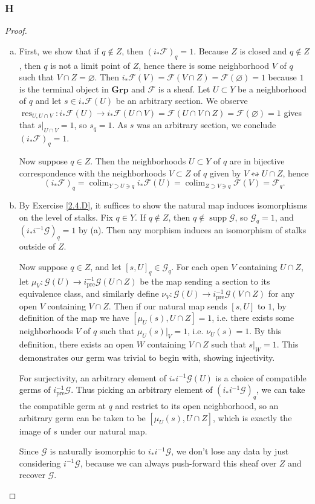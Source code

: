 \documentclass{article}
\newcommand{\fF}{\mathscr{F}}
\newcommand{\fG}{\mathscr{G}}
\newcommand{\Grp}{\mathbf{Grp}} %
\DeclareMathOperator{\res}{\mathrm{res}}
\DeclareMathOperator{\pre}{\mathrm{pre}}
\DeclareMathOperator{\colim}{\mathrm{colim}}
\DeclareMathOperator{\supp}{\mathrm{supp}}
\let\emptyset\varnothing
\begin{document}
\subsubsection{H}\label{2.7.H}
\begin{proof}
    \begin{enumerate}[(a)]
        \item First, we show that if $q\notin Z$, then $(i_* \fF)_q = 1$. Because $Z$ is closed and $q\notin Z$, then $q$ is not a limit point of $Z$, hence there is some neighborhood $V$ of $q$ such that $V\cap Z = \emptyset$. Then $i_*\fF(V) = \fF(V\cap Z)=\fF(\emptyset)=1$ because $1$ is the terminal object in $\Grp$ and $\fF$ is a sheaf. Let $U\subset Y$ be a neighborhood of $q$ and let $s\in i_*\fF(U)$ be an arbitrary section. We observe $\res_{U,U\cap V}:i_* \fF(U) \to i_*\fF(U\cap V)= \fF(U\cap V \cap Z)=\fF(\emptyset)=1$ gives that $s\vert_{U\cap V}=1$, so $s_q=1$. As $s$ was an arbitrary section, we conclude $(i_* \fF)_q =1$.
        
        Now suppose $q\in Z$. Then the neighborhoods $U\subset Y$ of $q$ are in bijective correspondence with the neighborhoods $V\subset Z$ of $q$ given by $V\leftrightsquigarrow U\cap Z$, hence
        \[
        (i_* \fF)_q = \colim_{Y\supset U\ni q} i_* \fF(U) = \colim_{Z\supset V \ni q} \fF(V) =\fF_q.
        \]
         \item By Exercise \ref{2.4.D}, it suffices to show the natural map induces isomorphisms on the level of stalks. Fix $q\in Y$. If $q\notin Z$, then $q\notin \supp \fG$, so $\fG_q=1$, and $(i_*i^{-1} \fG)_q =1$ by (a). Then any morphism induces an isomorphism of stalks outside of $Z$.

         Now suppose $q\in Z$, and let $[s,U]_q \in \fG_q$. For each open $V$ containing $U\cap Z$, let $\mu_V:\fG(U)\to i^{-1}_{\pre}\fG (U\cap Z)$ be the map sending a section to its equivalence class, and similarly define $\nu_V:\fG(U)\to i^{-1}_{\pre} \fG(V\cap Z)$ for any open $V$ containing $V\cap Z$. Then if our natural map sends $[s,U]$ to $1$, by definition of the map we have $[\mu_U(s),U\cap Z]=1$, i.e. there exists some neighborhoods $V$ of $q$ such that $\mu_U(s)\vert_V =1$, i.e. $\nu_U(s)=1$. By this definition, there exists an open $W$ containing $V\cap Z$ such that $s\vert_W=1$. This demonstrates our germ was trivial to begin with, showing injectivity.

         For surjectivity, an arbitrary element of $i_* i^{-1} \fG(U)$ is a choice of compatible germs of $i^{-1}_{\pre} \fG$. Thus picking an arbitrary element of $(i_* i^{-1} \fG)_q$, we can take the compatible germ at $q$ and restrict to its open neighborhood, so an arbitrary germ can be taken to be $[\mu_U(s),U\cap Z]$, which is exactly the image of $s$ under our natural map.

         Since $\fG$ is naturally isomorphic to $i_* i^{-1} \fG$, we don't lose any data by just considering $i^{-1} \fG$, because we can always push-forward this sheaf over $Z$ and recover $\fG$.
    \end{enumerate}
   
\end{proof}
\end{document}
